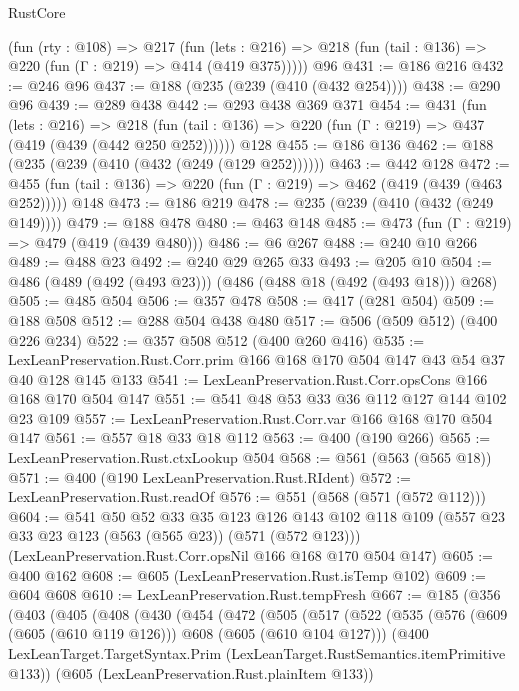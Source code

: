 \begin{lexlean}{RustCore}
\begin{coremodule}
{\begin{coremodule}
{{{{{    (fun (rty : @108) =>
    @217
      (fun (lets : @216) => @218 (fun (tail : @136) => @220 (fun (Γ : @219) => @414 (@419 @375)))))
    @96
@431 := @186 @216
@432 := @246 @96
@437 := @188 (@235 (@239 (@410 (@432 @254))))
@438 := @290 @96
@439 := @289 @438
@442 := @293 @438 @369 @371
@454 := @431
    (fun (lets : @216) =>
    @218 (fun (tail : @136) => @220 (fun (Γ : @219) => @437 (@419 (@439 (@442 @250 @252))))))
    @128
@455 := @186 @136
@462 := @188 (@235 (@239 (@410 (@432 (@249 (@129 @252))))))
@463 := @442 @128
@472 := @455 (fun (tail : @136) => @220 (fun (Γ : @219) => @462 (@419 (@439 (@463 @252))))) @148
@473 := @186 @219
@478 := @235 (@239 (@410 (@432 (@249 @149))))
@479 := @188 @478
@480 := @463 @148
@485 := @473 (fun (Γ : @219) => @479 (@419 (@439 @480)))
@486 := @6 @267
@488 := @240 @10 @266
@489 := @488 @23
@492 := @240 @29 @265 @33
@493 := @205 @10
@504 := @486 (@489 (@492 (@493 @23))) (@486 (@488 @18 (@492 (@493 @18))) @268)
@505 := @485 @504
@506 := @357 @478
@508 := @417 (@281 @504)
@509 := @188 @508
@512 := @288 @504 @438 @480
@517 := @506 (@509 @512) (@400 @226 @234)
@522 := @357 @508 @512 (@400 @260 @416)
@535 := LexLeanPreservation.Rust.Corr.prim @166 @168 @170 @504 @147 @43 @54 @37 @40 @128 @145 @133
@541 := LexLeanPreservation.Rust.Corr.opsCons @166 @168 @170 @504 @147
@551 := @541 @48 @53 @33 @36 @112 @127 @144 @102 @23 @109
@557 := LexLeanPreservation.Rust.Corr.var @166 @168 @170 @504 @147
@561 := @557 @18 @33 @18 @112
@563 := @400 (@190 @266)
@565 := LexLeanPreservation.Rust.ctxLookup @504
@568 := @561 (@563 (@565 @18))
@571 := @400 (@190 LexLeanPreservation.Rust.RIdent)
@572 := LexLeanPreservation.Rust.readOf
@576 := @551 (@568 (@571 (@572 @112)))
@604 := @541
    @50
    @52
    @33
    @35
    @123
    @126
    @143
    @102
    @118
    @109
    (@557 @23 @33 @23 @123 (@563 (@565 @23)) (@571 (@572 @123)))
    (LexLeanPreservation.Rust.Corr.opsNil @166 @168 @170 @504 @147)
@605 := @400 @162
@608 := @605 (LexLeanPreservation.Rust.isTemp @102)
@609 := @604 @608
@610 := LexLeanPreservation.Rust.tempFresh
@667 := @185
    (@356
      (@403
        (@405
          (@408
            (@430
              (@454
                (@472
                  (@505
                    (@517
                      (@522
                        (@535
                          (@576 (@609 (@605 (@610 @119 @126))) @608 (@605 (@610 @104 @127)))
                          (@400
                            LexLeanTarget.TargetSyntax.Prim
                            (LexLeanTarget.RustSemantics.itemPrimitive @133))
                          (@605 (LexLeanPreservation.Rust.plainItem @133))
}}}}}
\end{coremodule}}
\end{coremodule}
\end{lexlean}
